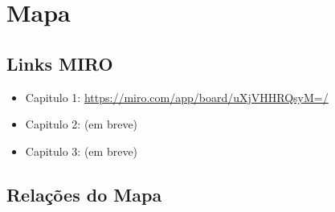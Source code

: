 \documentclass[12pt]{article}
\begin{document}
\newpage

\section{Mapa}

\subsection{Links MIRO}

\begin{itemize}
    \item Capitulo 1: \url{https://miro.com/app/board/uXjVHHRQsyM=/}
    \item Capitulo 2: (em breve)
    \item Capitulo 3: (em breve)
\end{itemize}

\subsection{Relações do Mapa}
\end{document}
